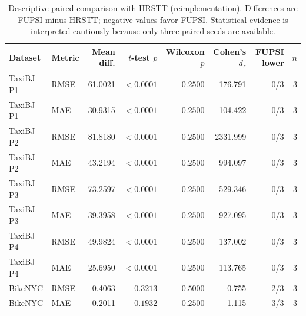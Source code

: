 \begin{table}[!htbp]
\centering
\caption{Descriptive paired comparison with HRSTT (reimplementation). Differences are FUPSI minus HRSTT; negative values favor FUPSI. Statistical evidence is interpreted cautiously because only three paired seeds are available.}
\label{tab:hrstt-paired-statistics}
\scriptsize
\setlength{\tabcolsep}{4pt}
\begin{tabular}{llrrrrrr}
\toprule
Dataset & Metric & Mean diff. & $t$-test $p$ & Wilcoxon $p$ & Cohen's $d_z$ & FUPSI lower & $n$ \\
\midrule
TaxiBJ P1 & RMSE & 61.0021 & $<0.0001$ & $0.2500$ & 176.791 & 0/3 & 3 \\
TaxiBJ P1 & MAE & 30.9315 & $<0.0001$ & $0.2500$ & 104.422 & 0/3 & 3 \\
TaxiBJ P2 & RMSE & 81.8180 & $<0.0001$ & $0.2500$ & 2331.999 & 0/3 & 3 \\
TaxiBJ P2 & MAE & 43.2194 & $<0.0001$ & $0.2500$ & 994.097 & 0/3 & 3 \\
TaxiBJ P3 & RMSE & 73.2597 & $<0.0001$ & $0.2500$ & 529.346 & 0/3 & 3 \\
TaxiBJ P3 & MAE & 39.3958 & $<0.0001$ & $0.2500$ & 927.095 & 0/3 & 3 \\
TaxiBJ P4 & RMSE & 49.9824 & $<0.0001$ & $0.2500$ & 137.002 & 0/3 & 3 \\
TaxiBJ P4 & MAE & 25.6950 & $<0.0001$ & $0.2500$ & 113.765 & 0/3 & 3 \\
BikeNYC & RMSE & -0.4063 & $0.3213$ & $0.5000$ & -0.755 & 2/3 & 3 \\
BikeNYC & MAE & -0.2011 & $0.1932$ & $0.2500$ & -1.115 & 3/3 & 3 \\
\bottomrule
\end{tabular}
\end{table}
